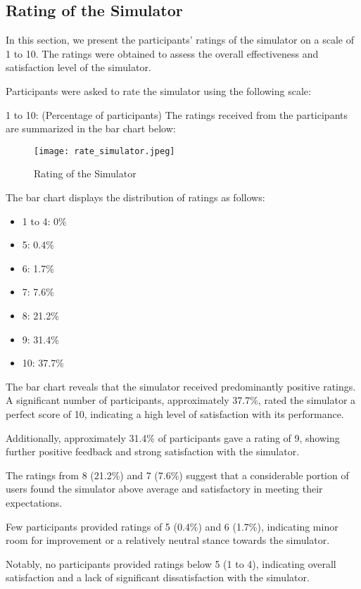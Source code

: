 \documentclass[conference]{/home/habib/Desktop/flash_ssd_simulator_web/paper_writing/latex_file/IEEEtran}
\begin{document}
\subsection{Rating of the Simulator}
In this section, we present the participants' ratings of the simulator on a scale of 1 to 10. The ratings were obtained to assess the overall effectiveness and satisfaction level of the simulator.

Participants were asked to rate the simulator using the following scale:

1 to 10: (Percentage of participants)
The ratings received from the participants are summarized in the bar chart below:
\begin{figure}[h]
    \centering
    \texttt{[image: rate\_simulator.jpeg]}
    \caption{Rating of the Simulator}
    \label{fig:enter-label}
\end{figure}
The bar chart displays the distribution of ratings as follows:
\begin{itemize}
    \item 1 to 4: 0\%
    \item 5: 0.4\%
    \item 6: 1.7\%
    \item 7: 7.6\%
    \item 8: 21.2\%
    \item 9: 31.4\%
    \item 10: 37.7\%
\end{itemize}
The bar chart reveals that the simulator received predominantly positive ratings. A significant number of participants, approximately 37.7\%, rated the simulator a perfect score of 10, indicating a high level of satisfaction with its performance.

Additionally, approximately 31.4\% of participants gave a rating of 9, showing further positive feedback and strong satisfaction with the simulator.

The ratings from 8 (21.2\%) and 7 (7.6\%) suggest that a considerable portion of users found the simulator above average and satisfactory in meeting their expectations.

Few participants provided ratings of 5 (0.4\%) and 6 (1.7\%), indicating minor room for improvement or a relatively neutral stance towards the simulator.

Notably, no participants provided ratings below 5 (1 to 4), indicating overall satisfaction and a lack of significant dissatisfaction with the simulator.
\end{document}
